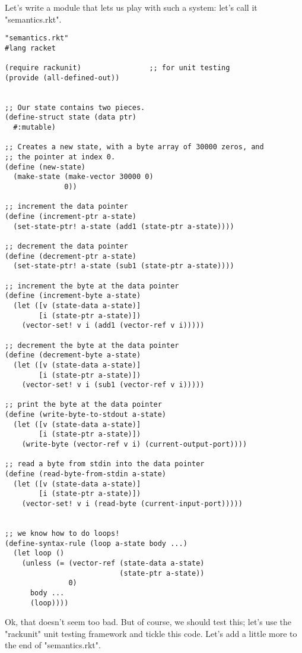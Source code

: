 \documentclass{article}
\begin{document}
Let’s write a module that lets us play with such a system: let’s call it "semantics.rkt".
\begin{verbatim}
"semantics.rkt"
#lang racket
 
(require rackunit)                ;; for unit testing
(provide (all-defined-out))
 
 
;; Our state contains two pieces.
(define-struct state (data ptr)
  #:mutable)
 
;; Creates a new state, with a byte array of 30000 zeros, and
;; the pointer at index 0.
(define (new-state)
  (make-state (make-vector 30000 0)
              0))
 
;; increment the data pointer
(define (increment-ptr a-state)
  (set-state-ptr! a-state (add1 (state-ptr a-state))))
 
;; decrement the data pointer
(define (decrement-ptr a-state)
  (set-state-ptr! a-state (sub1 (state-ptr a-state))))
 
;; increment the byte at the data pointer
(define (increment-byte a-state)
  (let ([v (state-data a-state)]
        [i (state-ptr a-state)])
    (vector-set! v i (add1 (vector-ref v i)))))
 
;; decrement the byte at the data pointer
(define (decrement-byte a-state)
  (let ([v (state-data a-state)]
        [i (state-ptr a-state)])
    (vector-set! v i (sub1 (vector-ref v i)))))
 
;; print the byte at the data pointer
(define (write-byte-to-stdout a-state)
  (let ([v (state-data a-state)]
        [i (state-ptr a-state)])
    (write-byte (vector-ref v i) (current-output-port))))
 
;; read a byte from stdin into the data pointer
(define (read-byte-from-stdin a-state)
  (let ([v (state-data a-state)]
        [i (state-ptr a-state)])
    (vector-set! v i (read-byte (current-input-port)))))
 
 
;; we know how to do loops!
(define-syntax-rule (loop a-state body ...)
  (let loop ()
    (unless (= (vector-ref (state-data a-state)
                           (state-ptr a-state))
               0)
      body ...
      (loop))))
\end{verbatim}
Ok, that doesn’t seem too bad. But of course, we should test this; let’s use the "rackunit" unit testing framework and tickle this code. Let’s add a little more to the end of "semantics.rkt".
\end{document}
